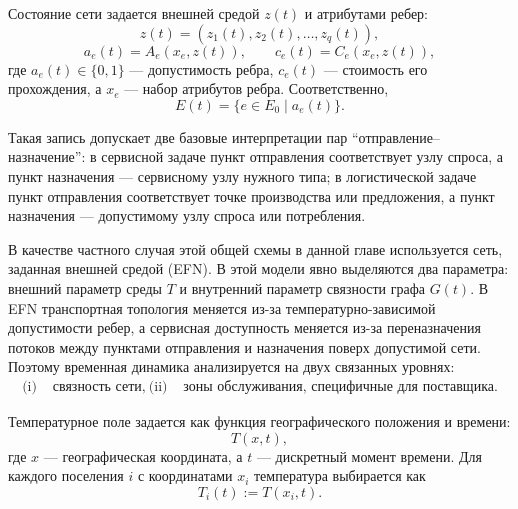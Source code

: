Состояние сети задается внешней средой \(z(t)\) и атрибутами ребер:
\begin{equation}
z(t)=\left(z_1(t),z_2(t),\dots,z_q(t)\right),
\label{eq:external-state}
\end{equation}
\begin{equation}
a_e(t)=A_e(x_e,z(t)),
\qquad
c_e(t)=C_e(x_e,z(t)),
\label{eq:edge-state-functions}
\end{equation}
где \(a_e(t)\in\{0,1\}\) --- допустимость ребра, \(c_e(t)\) ---
стоимость его прохождения, а \(x_e\) --- набор атрибутов ребра.
Соответственно,
\begin{equation}
E(t)=\{e\in E_0 \mid a_e(t)\}.
\label{eq:available-edge-set}
\end{equation}

Такая запись допускает две базовые интерпретации пар ``отправление--назначение'': в сервисной задаче
пункт отправления соответствует узлу спроса, а пункт назначения --- сервисному узлу нужного
типа; в логистической задаче пункт отправления соответствует точке производства или
предложения, а пункт назначения --- допустимому узлу спроса или потребления.

В качестве частного случая этой общей схемы в данной главе используется
сеть, заданная внешней средой (EFN). В этой модели
явно выделяются два параметра: внешний параметр среды \(T\) и внутренний
параметр связности графа \(G(t)\). В EFN транспортная топология меняется из-за температурно-зависимой
допустимости ребер, а сервисная доступность меняется из-за переназначения
потоков между пунктами отправления и назначения поверх допустимой сети. Поэтому временная
динамика анализируется на двух связанных уровнях:
\begin{equation}
\begin{aligned}
\text{(i) }&\text{связность сети},\
\text{(ii) }&\text{зоны обслуживания, специфичные для поставщика}.
\end{aligned}
\label{eq:efn-two-levels}
\end{equation}

Температурное поле задается как функция географического положения и времени:
\begin{equation}
T(x,t),
\label{eq:temperature-field}
\end{equation}
где \(x\) --- географическая координата, а \(t\) --- дискретный момент
времени. Для каждого поселения \(i\) с координатами \(x_i\) температура
выбирается как
\begin{equation}
T_i(t):=T(x_i,t).
\label{eq:node-temperature}
\end{equation}

